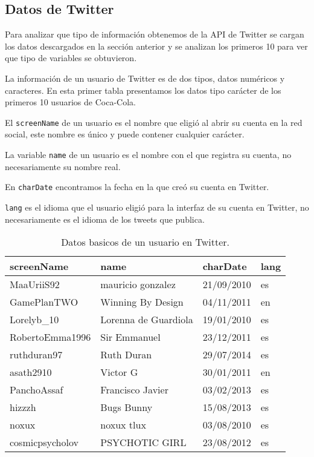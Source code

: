 \documentclass[openright, 12pt, twoside]{report}\usepackage[]{graphicx}\usepackage[]{color}
\begin{document}
\subsection*{Datos de Twitter}

Para analizar que tipo de información obtenemos de la API de Twitter se cargan los datos descargados en la sección anterior y se analizan los primeros 10 para ver que tipo de variables se obtuvieron.

La información de un usuario de Twitter es de dos tipos, datos numéricos y caracteres. En esta primer tabla presentamos los datos tipo carácter de los primeros 10 usuarios de Coca-Cola.

El \texttt{screenName} de un usuario es el nombre que eligió al abrir su cuenta en la red social, este nombre es único y puede contener cualquier carácter.

La variable \texttt{name} de un usuario es el nombre con el que registra su cuenta, no necesariamente su nombre real.

En \texttt{charDate} encontramos la fecha en la que creó su cuenta en Twitter.

\texttt{lang} es el idioma que el usuario eligió para la interfaz de su cuenta en Twitter, no necesariamente es el idioma de los tweets que publica.

\begin{table}[ht]
\centering
\begin{tabular}{llll}
  \hline
screenName & name & charDate & lang \\ 
  \hline
MaaUriiS92 & mauricio gonzalez  & 21/09/2010 & es \\ 
  GamePlanTWO & Winning By Design & 04/11/2011 & en \\ 
  Lorelyb\_10 & Lorenna de Guardiola & 19/01/2010 & es \\ 
  RobertoEmma1996 & Sir Emmanuel & 23/12/2011 & es \\ 
  ruthduran97 & Ruth Duran & 29/07/2014 & es \\ 
  asath2910 & Victor G & 30/01/2011 & en \\ 
  PanchoAssaf & Francisco Javier  & 03/02/2013 & es \\ 
  hizzzh & Bugs Bunny & 15/08/2013 & es \\ 
  noxux & noxux tlux & 03/08/2010 & es \\ 
  cosmicpsycholov & PSYCHOTIC GIRL & 23/08/2012 & es \\ 
   \hline
\end{tabular}
\caption{Datos basicos de un usuario en Twitter.} 
\end{table}
\end{document}
